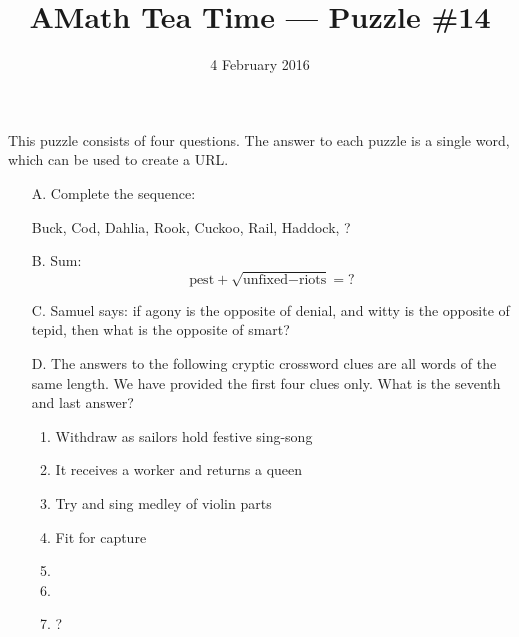 \documentclass[12pt]{article}
\title{AMath Tea Time --- Puzzle \#14}
\author{}
\date{\vspace{-1cm}4 February 2016}
\begin{document}
\maketitle
{}

This puzzle consists of four questions. The answer to each puzzle is a single
word, which can be used to create a URL.

\begin{itemize}
\item[A.] Complete the sequence:
  \begin{center}
    Buck, Cod, Dahlia, Rook, Cuckoo, Rail, Haddock, ?
  \end{center}
 
\item[B.] Sum:
  \[
  \textrm{pest} + \sqrt{\textrm{unfixed} - \textrm{riots}} = \textrm{?}
  \]
 
\item[C.] Samuel says: if agony is the opposite of denial, and witty is the
  opposite of tepid, then what is the opposite of smart?
 
\item[D.] The answers to the following cryptic crossword clues are all words of
  the same length. We have provided the first four clues only. What is the
  seventh and last answer?
  \begin{enumerate}
    \item Withdraw as sailors hold festive sing-song
    \item It receives a worker and returns a queen
    \item Try and sing medley of violin parts
    \item Fit for capture
    \item 
    \item
    \item ?
    \end{enumerate}
\end{itemize}
\end{document}
